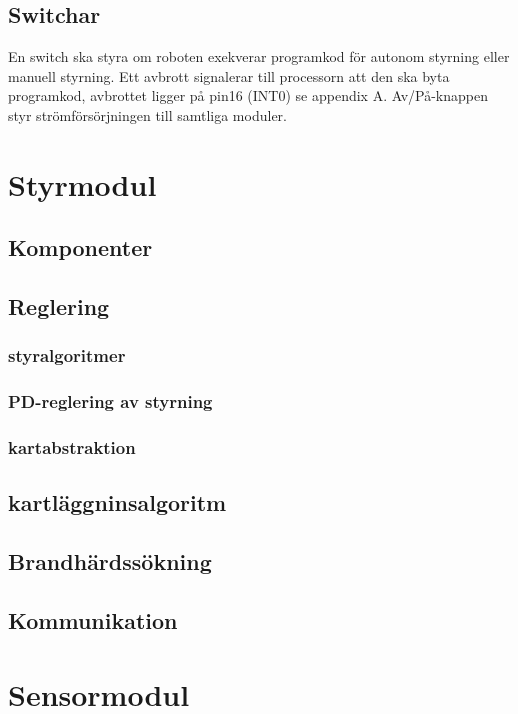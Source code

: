 \documentclass[a4paper,12pt,fleqn]{article}
\begin{document}
\subsection{Switchar}
En switch ska styra om roboten exekverar programkod för autonom styrning eller manuell styrning. Ett avbrott signalerar till processorn att den ska byta programkod, avbrottet ligger på pin16 (INT0) se appendix A. 
Av/På-knappen styr strömförsörjningen till samtliga moduler. 

\section{Styrmodul}


\subsection{Komponenter}
\subsection{Reglering}
\subsubsection{styralgoritmer}
\subsubsection{PD-reglering av styrning}
\subsubsection{kartabstraktion}
\subsection{kartläggninsalgoritm}
\subsection{Brandhärdssökning}
\subsection{Kommunikation}

\section{Sensormodul}
\end{document}
